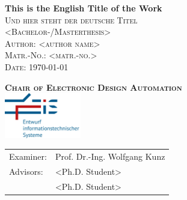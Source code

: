 \begin{titlepage} %

    \centering %
	\vspace*{3\baselineskip} %
	
	\textcolor{rptudunkelblau}{\LARGE \textbf{This is the English Title of the Work}\\} 
	\vspace{1\baselineskip} %
	\textcolor{rptudunkelblau}{\scshape\Large Und hier steht der deutsche Titel\\} 
	\vspace{5\baselineskip} %
	\textcolor{rptudunkelblau}{\scshape\Large <Bachelor-/Masterthesis>\\} 
	\vspace{1\baselineskip} %
	\textcolor{rptudunkelblau}{\scshape\Large Author: <author name>\\} 
	\vspace{1\baselineskip} %
	\textcolor{rptudunkelblau}{\scshape\Large Matr.-No.: <matr.-no.>\\} 
	\vspace{1\baselineskip} %
	\textcolor{rptudunkelblau}{\scshape\Large Date: \today\\} 
	
	\vspace{4\baselineskip} %
	\textcolor{rptudunkelblau}{\scshape\Large \textbf{Chair of Electronic Design Automation}\\}
	\vspace{1\baselineskip}
    \includegraphics[width=0.25\textwidth]{images/EIS-Logo.png}\\
    \vspace{3\baselineskip}
	\textcolor{rptudunkelblau}{\scshape\Large \begin{tabular}{ll}
		Examiner: & Prof. Dr.-Ing. Wolfgang Kunz\\
		Advisors: & <Ph.D. Student>\\
		& <Ph.D. Student>
	\end{tabular}}
	
\end{titlepage}
